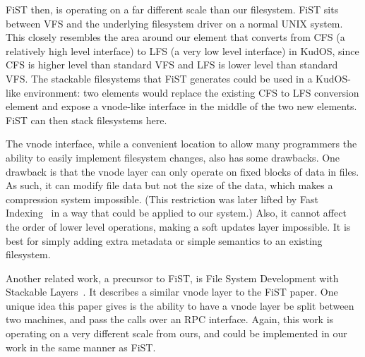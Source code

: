 FiST then, is operating on a far different scale than our filesystem.
FiST sits between VFS and the underlying filesystem driver on a normal
UNIX system. This closely resembles the area around our element that
converts from CFS (a relatively high level interface) to LFS (a very
low level interface) in KudOS, since CFS is higher level than standard
VFS and LFS is lower level than standard VFS. The stackable
filesystems that FiST generates could be used in a KudOS-like
environment: two elements would replace the existing CFS to LFS
conversion element and expose a vnode-like interface in the middle of
the two new elements. FiST can then stack filesystems here.

The vnode interface, while a convenient location to allow many
programmers the ability to easily implement filesystem changes, also
has some drawbacks. One drawback is that the vnode layer can only
operate on fixed blocks of data in files. As such, it can modify file
data but not the size of the data, which makes a compression system
impossible. (This restriction was later lifted by Fast
Indexing~\cite{zadokfast} in a way that could be applied to our
system.)  Also, it cannot affect the order of lower level operations,
making a soft updates layer impossible. It is best for simply adding
extra metadata or simple semantics to an existing filesystem.

Another related work, a precursor to FiST, is File System Development
with Stackable Layers~\cite{heidemann93stack}. It describes a similar
vnode layer to the FiST paper. One unique idea this paper gives is the
ability to have a vnode layer be split between two machines, and pass
the calls over an RPC interface. Again, this work is operating on a
very different scale from ours, and could be implemented in our work
in the same manner as FiST.

